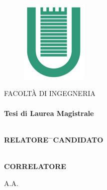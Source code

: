 

\begin{titlepage}

\pagestyle{empty}

\begin{center}
    \Large{\textbf{\UNIVERSITA}} \\ \vspace{0.5cm}

    \begin{figure}[H]
        \begin{center}
            \includegraphics[height=4cm]{figs/logo_utv_square.png}
        \end{center}
    \end{figure}

    \Large{FACOLT\`A DI INGEGNERIA} \\ \vspace{1.5cm}
    \Large{\CORSO} \\ \vspace{1.25cm}
    \textbf{Tesi di Laurea Magistrale} \\ \vspace{1.25cm}
    \LARGE{\textbf{\Titolo}} \\ \vspace{1.5cm}

    \large
    \begin{tabbing}
        \textbf{RELATORE} \= \hspace{9cm} \= \hfill \textbf{CANDIDATO}\\ \\
        \relatore \>  \> \autore
    \end{tabbing}
    \vspace{0.1cm}
    \begin{tabbing}
        \textbf{CORRELATORE}
    \end{tabbing}
    \begin{tabbing}
        \correlatore
    \end{tabbing}

    \vspace{0.1cm}
    \vfill
    \Large{A.A. \anno}
\end{center}

\end{titlepage}

\restoregeometry
